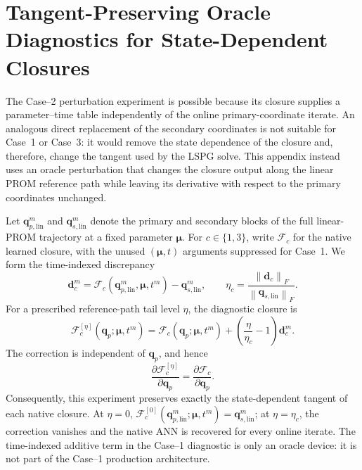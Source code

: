 \documentclass[11pt]{article}
\newcommand{\qp}{\mathbf q_p}
\newcommand{\mub}{\bm\mu}
\begin{document}
\section{Tangent-Preserving Oracle Diagnostics for State-Dependent Closures}
\label{app:state-dependent-oracles}

The Case--2 perturbation experiment is possible because its closure supplies a
parameter--time table independently of the online primary-coordinate iterate.
An analogous direct replacement of the secondary coordinates is not suitable
for Case~1 or Case~3: it would remove the state dependence of the closure and,
therefore, change the tangent used by the LSPG solve.  This appendix instead
uses an oracle perturbation that changes the closure output along the linear
PROM reference path while leaving its derivative with respect to the primary
coordinates unchanged.

Let \(\mathbf q_{p,\mathrm{lin}}^m\) and \(\mathbf q_{s,\mathrm{lin}}^m\) denote the
primary and secondary blocks of the full linear-PROM trajectory at a fixed
parameter \(\mub\).  For \(c\in\{1,3\}\), write \(\mathcal F_c\) for the
native learned closure, with the unused \((\mub,t)\) arguments suppressed for
Case~1.  We form the time-indexed discrepancy
\begin{equation}
\mathbf d_c^m
=
\mathcal F_c\!\left(\mathbf q_{p,\mathrm{lin}}^m,\mub,t^m\right)
-\mathbf q_{s,\mathrm{lin}}^m,
\qquad
\eta_c
=
\frac{\left\|\mathbf d_c\right\|_F}
     {\left\|\mathbf q_{s,\mathrm{lin}}\right\|_F}.
\label{eq:case13-oracle-discrepancy}
\end{equation}
For a prescribed reference-path tail level \(\eta\), the diagnostic closure is
\begin{equation}
\mathcal F_c^{[\eta]}\!\left(\qp;\mub,t^m\right)
=
\mathcal F_c\!\left(\qp;\mub,t^m\right)
+
\left(\frac{\eta}{\eta_c}-1\right)\mathbf d_c^m.
\label{eq:case13-oracle-closure}
\end{equation}
The correction is independent of \(\qp\), and hence
\begin{equation}
\frac{\partial \mathcal F_c^{[\eta]}}{\partial\qp}
=
\frac{\partial \mathcal F_c}{\partial\qp}.
\label{eq:case13-oracle-tangent}
\end{equation}
Consequently, this experiment preserves exactly the state-dependent tangent
of each native closure.  At \(\eta=0\),
\(\mathcal F_c^{[0]}(\mathbf q_{p,\mathrm{lin}}^m;\mub,t^m)=\mathbf q_{s,\mathrm{lin}}^m\);
at \(\eta=\eta_c\), the correction vanishes and the native ANN is recovered
for every online iterate.  The time-indexed additive term in the Case--1
diagnostic is only an oracle device: it is not part of the Case--1 production
architecture.
\end{document}
